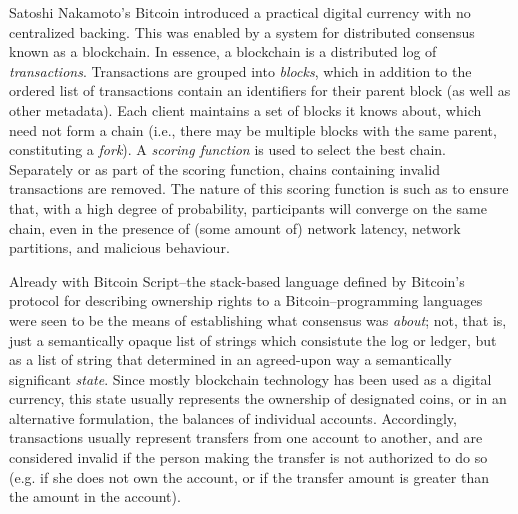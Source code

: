 Satoshi Nakamoto's Bitcoin introduced a practical digital currency with no
centralized backing.\cite{Nakamoto2008} This was enabled by a system for
distributed consensus known as a blockchain. In essence, a blockchain is a
distributed log of \textit{transactions}. Transactions are grouped into
\textit{blocks}, which in addition to the ordered list of transactions
contain an identifiers for their parent block (as well as other metadata). Each
client maintains a set of blocks it knows about, which need not form a chain
(i.e., there may be multiple blocks with the same parent, constituting a
\textit{fork}). A \textit{scoring function} is used to select the best chain.
Separately or as part of the scoring function, chains containing invalid
transactions are removed. The nature of this scoring function is such as to
ensure that, with a high degree of probability, participants will converge on
the same chain, even in the presence of (some amount of) network latency,
network partitions, and malicious behaviour.

Already with Bitcoin Script--the stack-based language
defined by Bitcoin's protocol for describing ownership rights to a
Bitcoin--programming languages were seen to be the means of establishing what
consensus was \textit{about}; not, that is, just a semantically opaque list of
strings which consistute the log or ledger, but as a list of string that
determined in an agreed-upon way a semantically significant \textit{state}.
Since mostly blockchain technology has been used as a digital currency, this
state usually represents the ownership of designated coins, or in an
alternative formulation, the balances of individual accounts. Accordingly,
transactions usually represent transfers from one account to another, and are
considered invalid if the person making the transfer is not authorized to do so
(e.g. if she does not own the account, or if the transfer amount is greater
than the amount in the account).


